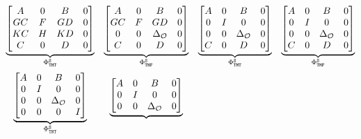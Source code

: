 \begin{equation}
    \label{eq:cont-skip} 
    \begin{matrix}
        \underbrace{\begin{bmatrix}
            A  & 0 & B & 0 \\
            GC & F & GD & 0 \\
            KC & H & KD & 0 \\
            C & 0 & D & 0 \\
        \end{bmatrix}}_{\clmat_{\cT\cH\cT}^{\Skip}} &
        \underbrace{\begin{bmatrix}
            A & 0 & B & 0 \\
            GC & F & GD & 0 \\
            0 & 0 & \Delta_\actuator & 0 \\
            C & 0 & D & 0
        \end{bmatrix}}_{\clmat_{\cT\cH\cF}^{\Skip}} &
        \underbrace{\begin{bmatrix}
            A & 0 & B & 0 \\
            0 & I & 0 & 0 \\
            0 & 0 & \Delta_\actuator & 0 \\
            C & 0 & D & 0
        \end{bmatrix}}_{\clmat_{\cT\cM\cT}^{\Skip}} &
        \underbrace{\begin{bmatrix}
            A & 0 & B & 0 \\
            0 & I & 0 & 0 \\
            0 & 0 & \Delta_\actuator & 0 \\
            C & 0 & D & 0
        \end{bmatrix}}_{\clmat_{\cT\cM\cF}^{\Skip}} \\[4em]
        \underbrace{\begin{bmatrix}
            A & 0 & B & 0 \\
            0 & I & 0 & 0 \\
            0 & 0 & \Delta_\actuator & 0 \\
            0 & 0 & 0 & I
        \end{bmatrix}}_{\clmat_{\cT\cN\cT}^{\Skip}} &
        \underbrace{\begin{bmatrix}
            A & 0 & B & 0 \\
            0 & I & 0 & 0 \\
            0 & 0 & \Delta_\actuator & 0 \\

\end{bmatrix}}
\end{matrix}
\end{equation}

